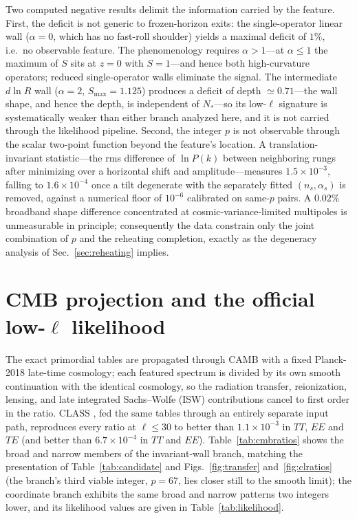 \documentclass[aps,prd,twocolumn,superscriptaddress,nofootinbib,longbibliography]{revtex4-2}
\begin{document}
Two computed negative results delimit the information carried by the feature.
First, the deficit is not generic to frozen-horizon exits: the
single-operator linear wall ($\alpha=0$, which has no fast-roll shoulder)
yields a maximal deficit of $1\%$, i.e.\ no observable feature. The
phenomenology requires $\alpha>1$---at $\alpha\le1$ the maximum of $S$ sits at
$z=0$ with $S=1$---and hence both high-curvature operators;
reduced single-operator walls eliminate the signal. The intermediate
$d\ln R$ wall ($\alpha=2$, $S_{\max}=1.125$) produces a deficit of depth
$\simeq0.71$---the wall shape, and hence the depth, is independent of
$N_*$---so its low-$\ell$ signature is systematically weaker than either
branch analyzed here, and it is not carried through the likelihood pipeline.
Second, the integer $p$ is not
observable through the scalar two-point function beyond the feature's
location. A translation-invariant statistic---the rms difference of
$\ln P(k)$ between neighboring rungs after minimizing over a horizontal
shift and amplitude---measures $1.5\times10^{-3}$, falling to
$1.6\times10^{-4}$ once a tilt degenerate with the separately fitted
$(n_s,\alpha_s)$ is removed, against a numerical floor of $10^{-6}$
calibrated on same-$p$ pairs. A $0.02\%$ broadband shape difference
concentrated at cosmic-variance-limited multipoles is unmeasurable in
principle; consequently the data constrain only the joint combination of $p$
and the reheating completion, exactly as the degeneracy analysis of
Sec.~\ref{sec:reheating} implies.

\section{CMB projection and the official low-$\ell$ likelihood}
\label{sec:cmb}
The exact primordial tables are propagated through CAMB \cite{CAMB} with a
fixed Planck-2018 late-time cosmology; each featured spectrum is divided by
its own smooth continuation with the identical cosmology, so the radiation
transfer, reionization, lensing, and late integrated Sachs--Wolfe (ISW)
contributions cancel to first order in the ratio. CLASS \cite{CLASS}, fed the
same tables through an entirely separate input path, reproduces every ratio
at $\ell\le30$ to better than $1.1\times10^{-3}$ in $TT$, $EE$ and $TE$
(and better than $6.7\times10^{-4}$ in $TT$ and $EE$). Table~\ref{tab:cmbratios}
shows the broad and narrow members of the invariant-wall branch, matching
the presentation of Table~\ref{tab:candidate} and Figs.~\ref{fig:transfer}
and~\ref{fig:clratios} (the branch's third viable integer, $p=67$, lies
closer still to the smooth limit); the coordinate branch exhibits the same
broad and narrow patterns two integers lower, and its likelihood values are
given in Table~\ref{tab:likelihood}.
\end{document}
